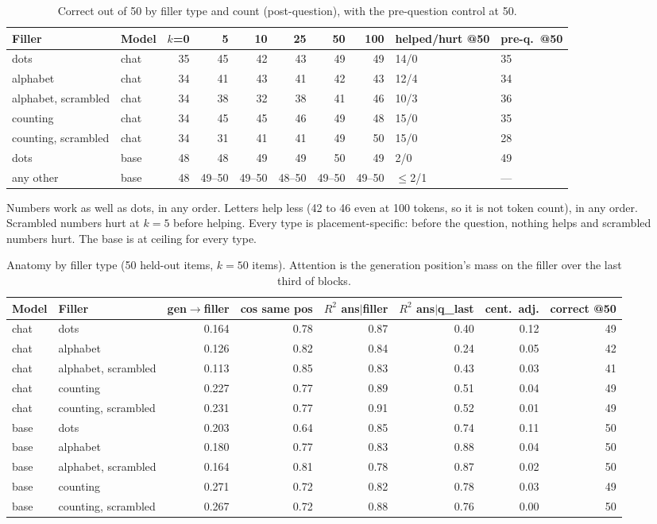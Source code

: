 \documentclass[11pt]{article}
\begin{document}
\begin{table}[h]\centering\scriptsize
\begin{tabular}{llrrrrrrll}\toprule
Filler & Model & $k$=0 & 5 & 10 & 25 & 50 & 100 & helped/hurt @50 & pre-q.\ @50 \\ \midrule
dots & chat & 35 & 45 & 42 & 43 & 49 & 49 & 14/0 & 35 \\
alphabet & chat & 34 & 41 & 43 & 41 & 42 & 43 & 12/4 & 34 \\
alphabet, scrambled & chat & 34 & 38 & 32 & 38 & 41 & 46 & 10/3 & 36 \\
counting & chat & 34 & 45 & 45 & 46 & 49 & 48 & 15/0 & 35 \\
counting, scrambled & chat & 34 & 31 & 41 & 41 & 49 & 50 & 15/0 & 28 \\
dots & base & 48 & 48 & 49 & 49 & 50 & 49 & 2/0 & 49 \\
any other & base & 48 & 49--50 & 49--50 & 48--50 & 49--50 & 49--50 & $\leq$2/1 & --- \\ \bottomrule
\end{tabular}
\caption{Correct out of 50 by filler type and count (post-question), with the pre-question control at 50.}\end{table}

Numbers work as well as dots, in any order. Letters help less (42 to 46 even at 100 tokens, so it is not token count), in any order. Scrambled numbers hurt at $k=5$ before helping. Every type is placement-specific: before the question, nothing helps and scrambled numbers hurt. The base is at ceiling for every type.

\begin{table}[h]\centering\scriptsize
\begin{tabular}{llrrrrrr}\toprule
Model & Filler & gen$\to$filler & cos same pos & $R^2$ ans$|$filler & $R^2$ ans$|$q\_last & cent.\ adj. & correct @50 \\ \midrule
chat & dots & 0.164 & 0.78 & 0.87 & 0.40 & 0.12 & 49 \\
chat & alphabet & 0.126 & 0.82 & 0.84 & 0.24 & 0.05 & 42 \\
chat & alphabet, scrambled & 0.113 & 0.85 & 0.83 & 0.43 & 0.03 & 41 \\
chat & counting & 0.227 & 0.77 & 0.89 & 0.51 & 0.04 & 49 \\
chat & counting, scrambled & 0.231 & 0.77 & 0.91 & 0.52 & 0.01 & 49 \\
base & dots & 0.203 & 0.64 & 0.85 & 0.74 & 0.11 & 50 \\
base & alphabet & 0.180 & 0.77 & 0.83 & 0.88 & 0.04 & 50 \\
base & alphabet, scrambled & 0.164 & 0.81 & 0.78 & 0.87 & 0.02 & 50 \\
base & counting & 0.271 & 0.72 & 0.82 & 0.78 & 0.03 & 49 \\
base & counting, scrambled & 0.267 & 0.72 & 0.88 & 0.76 & 0.00 & 50 \\ \bottomrule
\end{tabular}
\caption{Anatomy by filler type (50 held-out items, $k=50$ items). Attention is the generation position's mass on the filler over the last third of blocks.}\end{table}
\end{document}
